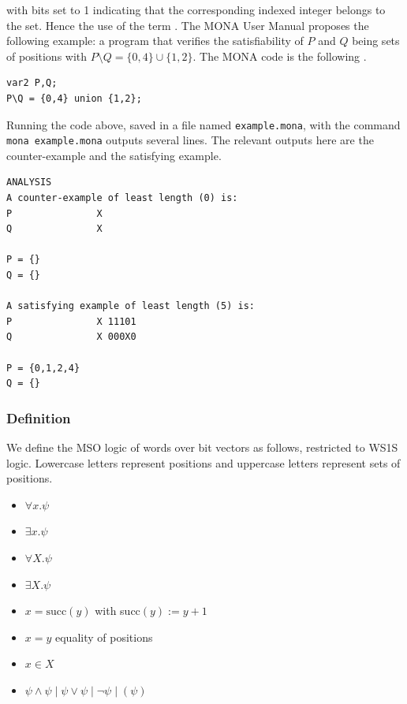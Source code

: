 \documentclass[12pt]{article}
\begin{document}
with bits set to 1 indicating that the corresponding indexed integer belongs to the set. Hence the use of the term . The MONA User Manual \cite{MONAguide} proposes the following example: a program that verifies the satisfiability of $P$ and $Q$ being sets of positions with $P\setminus Q=\{0,4\}\cup\{1,2\}$. The MONA code is the following .

\vspace{1em}
\hspace*{1cm}%
\begin{minipage}{\dimexpr\linewidth-2cm\relax}
\small
\begin{verbatim}
var2 P,Q;
P\Q = {0,4} union {1,2};
\end{verbatim}
\end{minipage}
\vspace{1em}

Running the code above, saved in a file named \verb|example.mona|, with the command \verb|mona example.mona| outputs several lines. The relevant outputs here are the counter-example and the satisfying example.

\vspace{1em}
\hspace*{1cm}%
\begin{minipage}{\dimexpr\linewidth-2cm\relax}
\small
\begin{verbatim}
ANALYSIS
A counter-example of least length (0) is:
P               X 
Q               X 

P = {}
Q = {}

A satisfying example of least length (5) is:
P               X 11101
Q               X 000X0

P = {0,1,2,4}
Q = {}
\end{verbatim}
\end{minipage}
\vspace{1em}

\subsubsection{Definition}

We define the MSO logic of words over bit vectors as follows, restricted to WS1S logic. Lowercase letters represent positions and uppercase letters represent sets of positions.

\begin{itemize}[label=$\mid$,itemsep=0pt,parsep=0pt]
    \item[$\psi :=$]  $\forall x.\psi$
    \item $\exists x.\psi$
    \item $\forall X.\psi$
    \item $\exists X.\psi$
    \item $x=\text{succ}(y)$ \quad with succ$(y):=y+1$
    \item $x=y$ \quad equality of positions
    \item $x\in X$ \quad {}
    \item $\psi\land\psi \;|\; \psi\lor\psi \;|\; \neg\psi \;|\; (\psi)$
\end{itemize}
\end{document}
